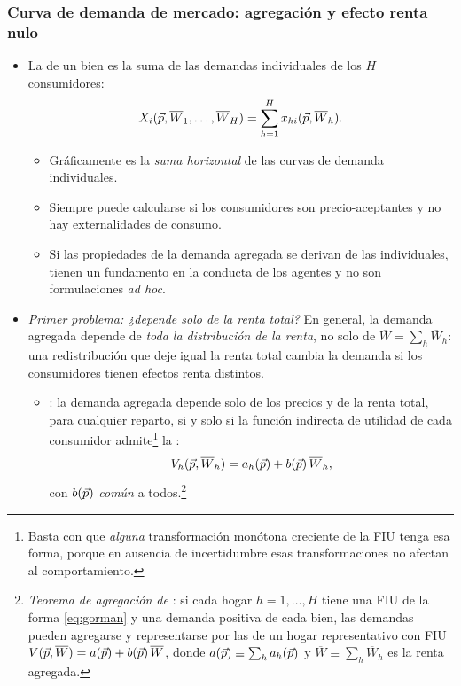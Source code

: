 \documentclass[11pt]{article}
\begin{document}
\subsubsection{Curva de demanda de mercado: agregación y efecto renta nulo}\label{sec:curva-demanda-mercado}

\begin{itemize}
\item La  de un bien es la suma de las demandas individuales de los $H$ consumidores:
  \begin{equation}
  X_i(\vec{p},\overline{W}_1,\dots,\overline{W}_H)=\sum_{h=1}^{H}x_{hi}(\vec{p},\overline{W}_h). \label{eq:demanda-mercado}
  \end{equation}
  \begin{itemize}
  \item Gráficamente es la \emph{suma horizontal} de las curvas de demanda individuales.
  \item Siempre puede calcularse si los consumidores son precio-aceptantes y no hay externalidades de consumo.
  \item Si las propiedades de la demanda agregada se derivan de las individuales, tienen un fundamento en la conducta de los agentes y no son formulaciones \emph{ad hoc}.
  \end{itemize}
\item \emph{Primer problema: ¿depende solo de la renta total?} En general, la demanda agregada depende de \emph{toda la distribución de la renta}, no solo de $\overline{W}=\sum_h\overline{W}_h$: una redistribución que deje igual la renta total cambia la demanda si los consumidores tienen efectos renta distintos.
  \begin{itemize}
  \item {} \textcite{Gorman1953Community}: la demanda agregada depende solo de los precios y de la renta total, para cualquier reparto, si y solo si la función indirecta de utilidad de cada consumidor admite\footnote{Basta con que \emph{alguna} transformación monótona creciente de la FIU tenga esa forma, porque en ausencia de incertidumbre esas transformaciones no afectan al comportamiento.} la  \textcite{Gorman1961Class}:
    \begin{equation}
    V_h(\vec{p},\overline{W}_h)=a_h(\vec{p})+b(\vec{p})\,\overline{W}_h, \label{eq:gorman}
    \end{equation}
    con $b(\vec{p})$ \emph{común} a todos.\footnote{\emph{Teorema de agregación de }: si cada hogar $h=1,\dots,H$ tiene una FIU de la forma \eqref{eq:gorman} y una demanda positiva de cada bien, las demandas pueden agregarse y representarse por las de un hogar representativo con FIU $V(\vec{p},\overline{W})=a(\vec{p})+b(\vec{p})\,\overline{W}$, donde $a(\vec{p})\equiv\sum_h a_h(\vec{p})$ y $\overline{W}\equiv\sum_h\overline{W}_h$ es la renta agregada.}

\end{itemize}
\end{itemize}
\end{document}

